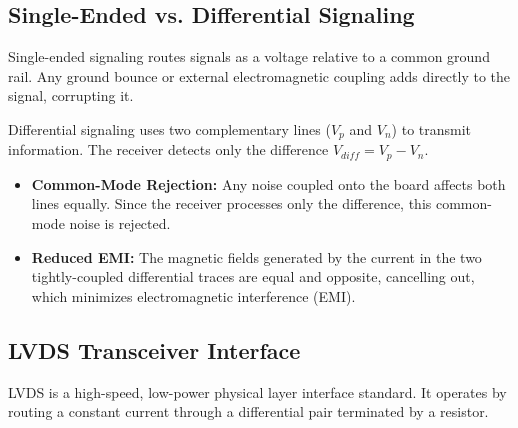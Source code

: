 \documentclass[12pt,a4paper]{article}
\begin{document}
\subsection{Single-Ended vs. Differential Signaling}
Single-ended signaling routes signals as a voltage relative to a common ground rail. Any ground bounce or external electromagnetic coupling adds directly to the signal, corrupting it.

Differential signaling uses two complementary lines ($V_p$ and $V_n$) to transmit information. The receiver detects only the difference $V_{diff} = V_p - V_n$.
\begin{itemize}[leftmargin=*, itemsep=2.5pt]
  \item \textbf{Common-Mode Rejection:} Any noise coupled onto the board affects both lines equally. Since the receiver processes only the difference, this common-mode noise is rejected.
  \item \textbf{Reduced EMI:} The magnetic fields generated by the current in the two tightly-coupled differential traces are equal and opposite, cancelling out, which minimizes electromagnetic interference (EMI).
\end{itemize}

\subsection{LVDS Transceiver Interface}
LVDS is a high-speed, low-power physical layer interface standard. It operates by routing a constant current through a differential pair terminated by a resistor.
\end{document}
